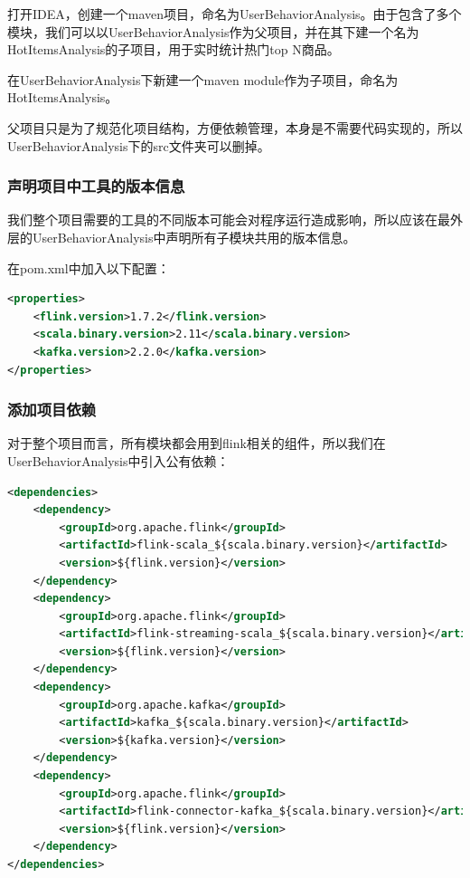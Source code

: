 \documentclass[oneside]{ctexbook}
\begin{document}
打开IDEA，创建一个maven项目，命名为UserBehaviorAnalysis。由于包含了多个模块，我们可以以UserBehaviorAnalysis作为父项目，并在其下建一个名为HotItemsAnalysis的子项目，用于实时统计热门top N商品。

在UserBehaviorAnalysis下新建一个maven module作为子项目，命名为HotItemsAnalysis。

父项目只是为了规范化项目结构，方便依赖管理，本身是不需要代码实现的，所以UserBehaviorAnalysis下的src文件夹可以删掉。

\subsubsection{声明项目中工具的版本信息}

我们整个项目需要的工具的不同版本可能会对程序运行造成影响，所以应该在最外层的UserBehaviorAnalysis中声明所有子模块共用的版本信息。

在pom.xml中加入以下配置：

\begin{lstlisting}[language=xml, caption=UserBehaviorAnalysis/pom.xml]
<properties>
    <flink.version>1.7.2</flink.version>
    <scala.binary.version>2.11</scala.binary.version>
    <kafka.version>2.2.0</kafka.version>
</properties>
\end{lstlisting}

\subsubsection{添加项目依赖}

对于整个项目而言，所有模块都会用到flink相关的组件，所以我们在UserBehaviorAnalysis中引入公有依赖：

\begin{lstlisting}[language=xml, caption=UserBehaviorAnalysis/pom.xml]
<dependencies>
    <dependency>
        <groupId>org.apache.flink</groupId>
        <artifactId>flink-scala_${scala.binary.version}</artifactId>
        <version>${flink.version}</version>
    </dependency>
    <dependency>
        <groupId>org.apache.flink</groupId>
        <artifactId>flink-streaming-scala_${scala.binary.version}</artifactId>
        <version>${flink.version}</version>
    </dependency>
    <dependency>
        <groupId>org.apache.kafka</groupId>
        <artifactId>kafka_${scala.binary.version}</artifactId>
        <version>${kafka.version}</version>
    </dependency>
    <dependency>
        <groupId>org.apache.flink</groupId>
        <artifactId>flink-connector-kafka_${scala.binary.version}</artifactId>
        <version>${flink.version}</version>
    </dependency>
</dependencies>
\end{lstlisting}
\end{document}
